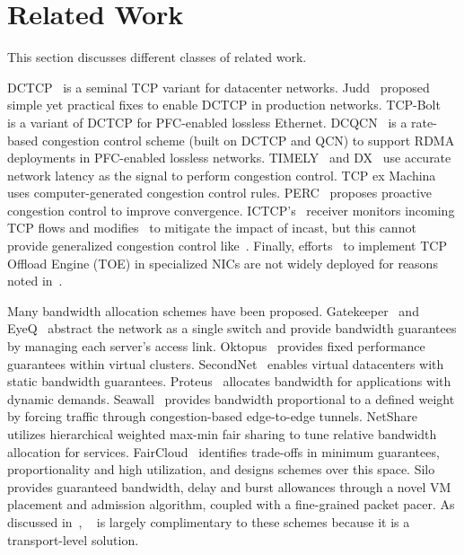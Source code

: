 \section{Related Work}
\label{related}
This section discusses different classes of related work.

DCTCP~\cite{dctcp} is a seminal TCP variant for datacenter networks.
Judd~\cite{judd2015nsdi} proposed simple yet practical fixes to enable DCTCP in production networks.
TCP-Bolt~\cite{stephens2014practical} is a variant of DCTCP for PFC-enabled lossless Ethernet.
DCQCN~\cite{zhu2015congestion} is a rate-based congestion control scheme (built on DCTCP and QCN) to
support RDMA deployments in PFC-enabled lossless networks.
TIMELY~\cite{mittal2015timely} and DX~\cite{lee2015accurate} 
use accurate network latency as the signal to perform congestion control.
TCP ex Machina~\cite{winstein2013tcp} uses computer-generated congestion control rules.
PERC~\cite{jose2015high} proposes proactive congestion control to improve convergence.
ICTCP's~\cite{wu2010ictcp} receiver monitors incoming TCP flows and 
modifies~\rwnd{} to mitigate the impact of incast, but this cannot
provide generalized congestion control like~\acdc{}.
Finally, efforts~\cite{dell-toe,chelsio-toe} to 
implement TCP Offload Engine (TOE) in specialized NICs are not widely deployed for reasons noted in~\cite{mogul2003tcp,linux-toe}.

 Many bandwidth allocation schemes have been proposed.
Gatekeeper~\cite{rodrigues2011gatekeeper} and EyeQ~\cite{jeyakumar2013eyeq} abstract the network as a single
switch and provide bandwidth guarantees by managing each server's access link.
Oktopus~\cite{Ballani2011oktopus} provides fixed performance guarantees within virtual clusters.
SecondNet~\cite{Guo2010Secondnet} enables virtual datacenters with static bandwidth guarantees.
Proteus~\cite{Xie2012Proteus} allocates bandwidth for applications with dynamic demands.
Seawall~\cite{shieh2011sharing} provides bandwidth proportional to a defined weight by
forcing traffic through congestion-based edge-to-edge tunnels. 
NetShare~\cite{Lam2012NetShare} utilizes hierarchical weighted max-min fair sharing to tune relative bandwidth allocation for services.
FairCloud~\cite{Popa2012Faircloud} identifies trade-offs in minimum
guarantees, proportionality and high utilization, and designs schemes over this space.
Silo~\cite{jang2015silo} provides guaranteed bandwidth, delay and burst allowances through a novel VM placement and admission 
algorithm, coupled with a fine-grained packet pacer. As discussed in~, 
~\acdc{} is largely complimentary to these schemes because it is a transport-level solution.

